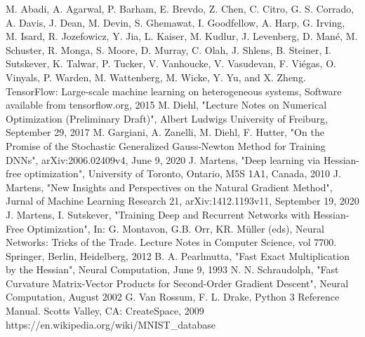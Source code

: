 \documentclass[conference]{IEEEtran}
\begin{document}
	
	
	\begin{thebibliography}{00}
		 M. Abadi, A. Agarwal, P. Barham, E. Brevdo,
		Z. Chen, C. Citro, G. S. Corrado, A. Davis,
		J. Dean, M. Devin, S. Ghemawat, I. Goodfellow,
		A. Harp, G. Irving, M. Isard, R. Jozefowicz, Y. Jia,
		L. Kaiser, M. Kudlur, J. Levenberg, D. Mané, M. Schuster,
		R. Monga, S. Moore, D. Murray, C. Olah, J. Shlens,
		B. Steiner, I. Sutskever, K. Talwar, P. Tucker,
		V. Vanhoucke, V. Vasudevan, F. Viégas,
		O. Vinyals, P. Warden, M. Wattenberg, M. Wicke,
		Y. Yu, and X. Zheng.
		TensorFlow: Large-scale machine learning on heterogeneous systems, Software available from tensorflow.org, 2015	
		 M. Diehl, "Lecture Notes on Numerical Optimization (Preliminary Draft)", Albert Ludwigs University of Freiburg, September 29, 2017	
		 M. Gargiani, A. Zanelli, M. Diehl, F. Hutter, "On the Promise of the Stochastic Generalized Gauss-Newton Method for Training DNNs",  arXiv:2006.02409v4, June 9, 2020 
		 J. Martens, "Deep learning via Hessian-free optimization", University of Toronto, Ontario, M5S 1A1, Canada, 2010
		 J. Martens, "New Insights and Perspectives on the Natural Gradient Method", Jurnal of Machine Learning Research 21, arXiv:1412.1193v11, September 19, 2020
		 J. Martens, I. Sutskever, "Training Deep and Recurrent Networks with Hessian-Free Optimization", In: G. Montavon, G.B. Orr, KR. Müller (eds), Neural Networks: Tricks of the Trade. Lecture Notes in Computer Science, vol 7700. Springer, Berlin, Heidelberg, 2012
		 B. A. Pearlmutta, "Fast Exact Multiplication by the Hessian", Neural Computation, June 9, 1993
		 N. N. Schraudolph, "Fast Curvature Matrix-Vector Products for Second-Order
		Gradient Descent", Neural Computation, August 2002
		 G. Van Rossum, F. L. Drake, Python 3 Reference Manual. Scotts Valley, CA: CreateSpace, 2009
		 https://en.wikipedia.org/wiki/MNIST\_database
	\end{thebibliography}
	
\end{document}
